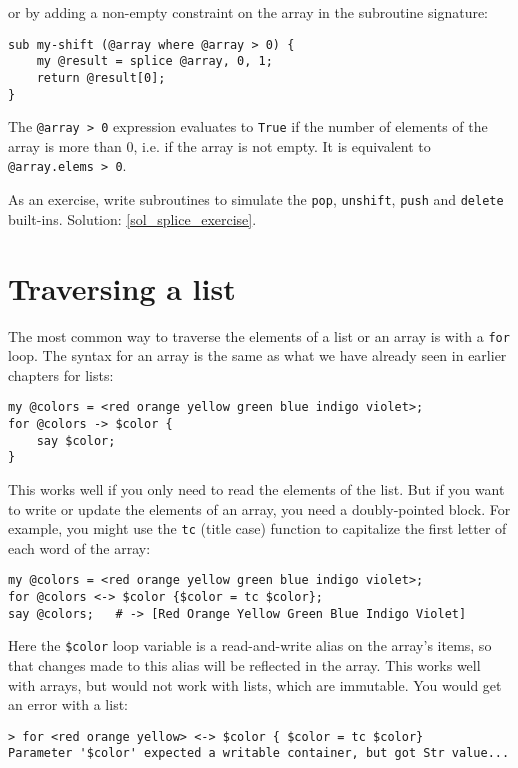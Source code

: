 or by adding a non-empty constraint on the array in the 
subroutine signature:

\begin{verbatim}
sub my-shift (@array where @array > 0) {
    my @result = splice @array, 0, 1;
    return @result[0];
}    
\end{verbatim}
%

The \verb'@array > 0' expression evaluates to {\tt True} if 
the number of elements of the array is more than 0, i.e. if the 
array is not empty. It is equivalent to \verb'@array.elems > 0'.

\label{splice_exercise}
As an exercise, write subroutines to simulate the {\tt pop}, 
{\tt unshift}, {\tt push} and {\tt delete} built-ins. Solution: \ref{sol_splice_exercise}.


\section{Traversing a list}

The most common way to traverse the elements of a list or an 
array is with a {\tt for} loop.  The syntax for an array is 
the same as what we have already seen in earlier chapters 
for lists:

\begin{verbatim}
my @colors = <red orange yellow green blue indigo violet>;
for @colors -> $color {
    say $color;
}
\end{verbatim}
%
This works well if you only need to read the elements of the
list.  But if you want to write or update the elements of an array, you
need a doubly-pointed block. For example, you might use the 
{\tt tc} (title case) function to capitalize the first letter 
of each word of the array:

\begin{verbatim}
my @colors = <red orange yellow green blue indigo violet>;
for @colors <-> $color {$color = tc $color};
say @colors;   # -> [Red Orange Yellow Green Blue Indigo Violet]
\end{verbatim}
%
Here the \verb'$color' loop variable is a read-and-write alias 
on the array's items, so that changes made to this alias will 
be reflected in the array. This works well with arrays, but 
would not work with lists, which are immutable. You would 
get an error with a list:

\begin{verbatim}
> for <red orange yellow> <-> $color { $color = tc $color}
Parameter '$color' expected a writable container, but got Str value...
\end{verbatim}

